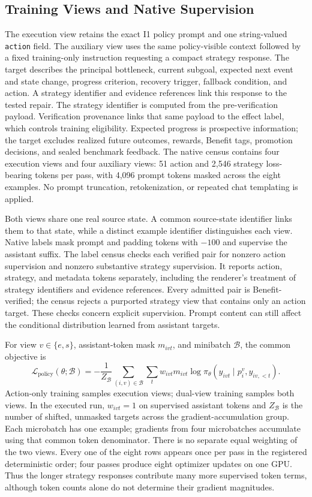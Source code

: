 \subsection{Training Views and Native Supervision}
\label{app:training-details}
The execution view retains the exact I1 policy prompt and one string-valued
\texttt{action} field. The auxiliary view uses the same policy-visible
context followed by a fixed training-only instruction requesting a compact
strategy response. The target describes the principal bottleneck, current
subgoal, expected next event and state change, progress criterion, recovery
trigger, fallback condition, and action. A strategy identifier and evidence
references link this response to the tested repair. The strategy identifier
is computed from the pre-verification payload.
Verification provenance links that same payload to the effect label, which
controls training eligibility. Expected progress is prospective information;
the target excludes realized future outcomes, rewards, Benefit tags,
promotion decisions, and sealed benchmark feedback. The native census contains four execution views and four auxiliary views:
51 action and 2,546 strategy loss-bearing tokens per pass, with 4,096
prompt tokens masked across the eight examples. No prompt truncation,
retokenization, or repeated chat templating is applied.

Both views share one real source state. A common source-state identifier
links them to that state, while a distinct example identifier distinguishes
each view. Native labels mask prompt and padding tokens with $-100$ and
supervise the assistant suffix. The label
census checks each verified pair for nonzero action supervision and nonzero
substantive strategy supervision. It reports action, strategy, and metadata
tokens separately, including the renderer's treatment of strategy identifiers and
evidence references. Every admitted pair is Benefit-verified; the census
rejects a purported strategy view that contains only an action target.
These checks concern explicit supervision. Prompt content can still affect
the conditional distribution learned from assistant targets.

For view $v\in\{e,s\}$, assistant-token mask $m_{ivt}$, and minibatch
$\mathcal B$, the common objective is
\begin{equation}
\mathcal L_{\mathrm{policy}}(\theta;\mathcal B)
=-\frac{1}{Z_{\mathcal B}}
\sum_{(i,v)\in\mathcal B}\sum_t
w_{ivt}m_{ivt}\log\pi_\theta(y_{ivt}\mid p_i^v,y_{iv,<t}).
\label{eq:loss}
\end{equation}
Action-only training samples execution views; dual-view training samples
both views. In the executed run, $w_{ivt}=1$ on supervised assistant tokens and
$Z_{\mathcal B}$ is the number of shifted, unmasked targets across the
gradient-accumulation group. Each microbatch has one example; gradients
from four microbatches accumulate using that common token denominator.
There is no separate equal weighting of the two views. Every one of the
eight rows appears once per pass in the registered deterministic order;
four passes produce eight optimizer updates on one GPU. Thus the longer
strategy responses contribute many more supervised token terms, although
token counts alone do not determine their gradient magnitudes.

